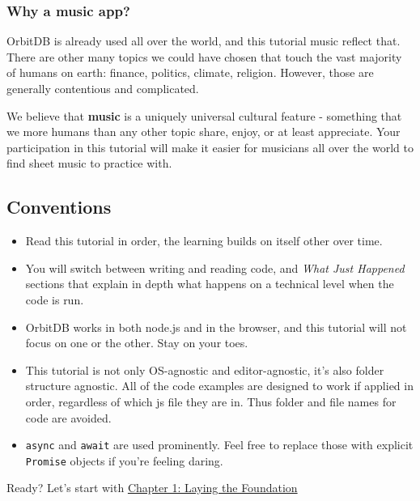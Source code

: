\subsubsection{Why a music app?}\label{why-a-music-app-1}

OrbitDB is already used all over the world, and this tutorial music
reflect that. There are other many topics we could have chosen that
touch the vast majority of humans on earth: finance, politics, climate,
religion. However, those are generally contentious and complicated.

We believe that \textbf{music} is a uniquely universal cultural feature
- something that we more humans than any other topic share, enjoy, or at
least appreciate. Your participation in this tutorial will make it
easier for musicians all over the world to find sheet music to practice
with.

\subsection{Conventions}\label{conventions-1}

\begin{itemize}
\tightlist
\item
  Read this tutorial in order, the learning builds on itself other over
  time.
\item
  You will switch between writing and reading code, and \emph{What Just
  Happened} sections that explain in depth what happens on a technical
  level when the code is run.
\item
  OrbitDB works in both node.js and in the browser, and this tutorial
  will not focus on one or the other. Stay on your toes.
\item
  This tutorial is not only OS-agnostic and editor-agnostic, it's also
  folder structure agnostic. All of the code examples are designed to
  work if applied in order, regardless of which js file they are in.
  Thus folder and file names for code are avoided.
\item
  \texttt{async} and \texttt{await} are used prominently. Feel free to
  replace those with explicit \texttt{Promise} objects if you're feeling
  daring.
\end{itemize}

Ready? Let's start with \href{./01_Basics.md}{Chapter 1: Laying the
Foundation}
